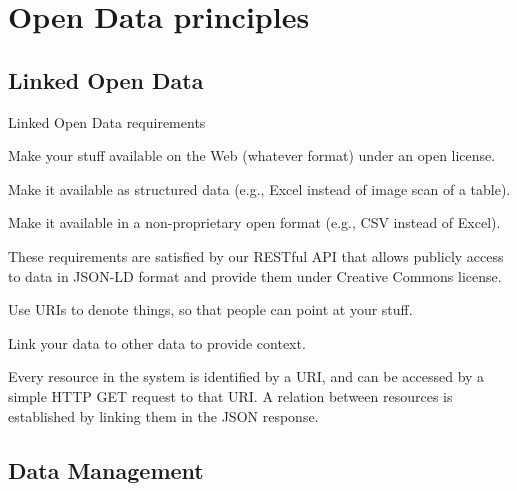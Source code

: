 \section[Open Data principles]{Open Data principles}

\subsection[Linked Open Data]{Linked Open Data}

\begin{frame}[allowframebreaks]{Linked Open Data\autocite{Berners-Lee_2006} requirements}
	\begin{block}{\faStar\faStarO\faStarO\faStarO\faStarO}
		Make your stuff available on the Web (whatever format) under an open
		license.
	\end{block}
	\vspace*{-8pt}
	\begin{block}{\faStar\faStar\faStarO\faStarO\faStarO}
		Make it available as structured data (e.g., Excel instead of image scan
		of a table).
	\end{block}
	\vspace*{-8pt}
	\begin{block}{\faStar\faStar\faStar\faStarO\faStarO}
		Make it available in a non-proprietary open format (e.g., CSV instead of
		Excel).
	\end{block}
	These requirements are satisfied by our RESTful API that allows
	publicly access to data in JSON-LD\autocite{Sporny_2014} format and provide
	them under Creative Commons license.

	\framebreak

	\begin{block}{\faStar\faStar\faStar\faStar\faStarO}
		Use URIs to denote things, so that people can point at your stuff.
	\end{block}
	\vspace*{-8pt}
	\begin{block}{\faStar\faStar\faStar\faStar\faStar}
		Link your data to other data to provide context.
	\end{block}
	Every resource in the system is identified by a URI, and can be accessed
	by a simple HTTP GET request to that URI. A relation between resources
	is established by linking them in the JSON response.
\end{frame}


\subsection[Data Management]{Data Management}

